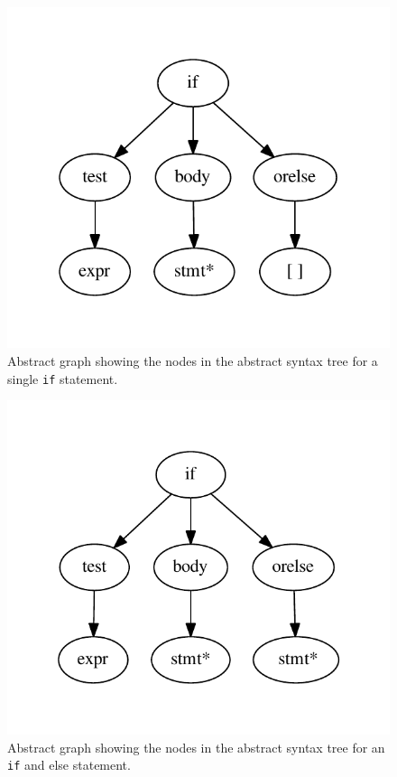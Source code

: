 \begin{figure}
  \centering
  \includegraphics[scale=.7]{./figures/dot_files/if_ast.pdf}
  \caption{Abstract graph showing the nodes in the abstract syntax tree for a single \texttt{if} statement.}
  \label{test:ast:if}
\end{figure}

\begin{figure}
  \centering
  \includegraphics[scale=.7]{./figures/dot_files/if_else.pdf}
  \caption{Abstract graph showing the nodes in the abstract syntax tree for an \texttt{if} and else statement.}
  \label{test:ast:if_else}
\end{figure}

